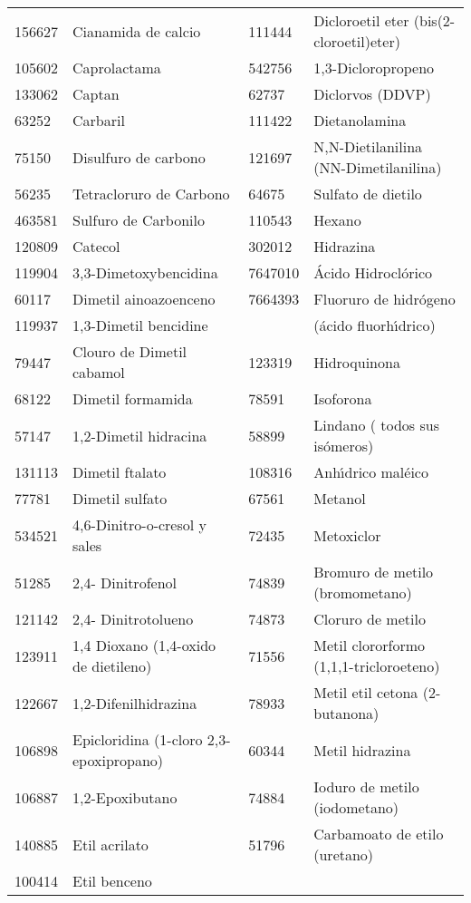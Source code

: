 \begin{table}[!htdp]
\begin{scriptsize}
\begin{supertabular}{| p{0.10\textwidth}p{0.35\textwidth}p{0.10\textwidth}p{0.35\textwidth} |}
156627 & Cianamida de calcio &111444&Dicloroetil eter (bis(2-cloroetil)eter)\\
105602& Caprolactama& 542756 &1,3-Dicloropropeno\\ 
133062 & Captan & 62737 & Diclorvos (DDVP)\\
63252 & Carbaril &111422& Dietanolamina\\
75150 & Disulfuro de carbono & 121697 & N,N-Dietilanilina (NN-Dimetilanilina) \\
56235 & Tetracloruro de Carbono &64675&Sulfato de dietilo\\
463581 & Sulfuro de Carbonilo  &110543&Hexano\\
120809 & Catecol & 302012&Hidrazina \\
119904 & 3,3-Dimetoxybencidina &7647010&  \'Acido Hidrocl\'orico\\
60117 & Dimetil ainoazoenceno&7664393& Fluoruro de hidr\'ogeno\\
119937 & 1,3-Dimetil bencidine & &(\'acido fluorh\'{\i}drico)\\
79447 & Clouro de Dimetil cabamol&123319&Hidroquinona\\
  68122 & Dimetil formamida &78591&Isoforona\\
  57147 & 1,2-Dimetil hidracina & 58899&Lindano ( todos sus is\'omeros) \\
  131113&  Dimetil ftalato &108316&Anh\'{\i}drico mal\'eico \\
  77781 &Dimetil sulfato &67561&Metanol \\
  534521& 4,6-Dinitro-o-cresol y sales & 72435&Metoxiclor \\
  51285 & 2,4- Dinitrofenol & 74839 & Bromuro de metilo (bromometano)\\
  121142 & 2,4- Dinitrotolueno & 74873& Cloruro de metilo \\
  123911 & 1,4 Dioxano (1,4-oxido de dietileno) &71556&Metil clororformo (1,1,1-tricloroeteno)\\
  122667 & 1,2-Difenilhidrazina &78933&Metil etil cetona (2-butanona) \\
  106898 & Epicloridina (1-cloro 2,3-epoxipropano)&60344 &Metil hidrazina\\
  106887 & 1,2-Epoxibutano &74884&Ioduro de metilo (iodometano)\\
  140885 & Etil acrilato &51796 &Carbamoato de etilo (uretano) \\
  100414 & Etil benceno &  &\\\hline
\end{supertabular}
\end{scriptsize}
\label{airtox}
\end{table}%


